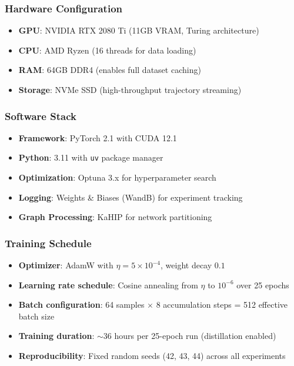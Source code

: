 \subsubsection{Hardware Configuration}

\begin{itemize}[noitemsep,topsep=0pt]
\item \textbf{GPU}: NVIDIA RTX 2080 Ti (11GB VRAM, Turing architecture)
\item \textbf{CPU}: AMD Ryzen (16 threads for data loading)
\item \textbf{RAM}: 64GB DDR4 (enables full dataset caching)
\item \textbf{Storage}: NVMe SSD (high-throughput trajectory streaming)
\end{itemize}

\subsubsection{Software Stack}

\begin{itemize}[noitemsep,topsep=0pt]
\item \textbf{Framework}: PyTorch 2.1 with CUDA 12.1
\item \textbf{Python}: 3.11 with \texttt{uv} package manager
\item \textbf{Optimization}: Optuna 3.x for hyperparameter search
\item \textbf{Logging}: Weights \& Biases (WandB) for experiment tracking
\item \textbf{Graph Processing}: KaHIP for network partitioning
\end{itemize}

\subsubsection{Training Schedule}

\begin{itemize}[noitemsep,topsep=0pt]
\item \textbf{Optimizer}: AdamW with $\eta = 5 \times 10^{-4}$, weight decay $0.1$
\item \textbf{Learning rate schedule}: Cosine annealing from $\eta$ to $10^{-6}$ over 25 epochs
\item \textbf{Batch configuration}: 64 samples $\times$ 8 accumulation steps = 512 effective batch size
\item \textbf{Training duration}: $\sim$36 hours per 25-epoch run (distillation enabled)
\item \textbf{Reproducibility}: Fixed random seeds (42, 43, 44) across all experiments
\end{itemize}

